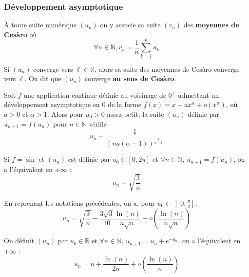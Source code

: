   \subsubsection{Développement asymptotique}


  \begin{definition}
    À toute suite numérique $(u_n)$ on y associe sa suite $(v_n)$ des \textbf{moyennes de Cesàro} où
    \[ \forall n \in \mathbb{N}, v_n = \frac{1}{n} \sum_{k=1}^{n} u_k \]
  \end{definition}

  \begin{theorem}
    Si $(u_n)$ converge vers $\ell \in \mathbb{K}$, alors sa suite des moyennes de Cesàro converge vers $\ell$. On dit que $(u_n)$ converge \textbf{au sens de Cesàro}.
  \end{theorem}


  \begin{proposition}
    Soit $f$ une application continue définie au voisinage de $0^+$ admettant
    un développement asymptotique en $0$ de la forme $f(x) = x - ax^\alpha + o(x^\alpha)$, où $a > 0$ et $\alpha > 1$. Alors pour $u_0 > 0$ assez petit, la suite $(u_n)$ définie par $u_{n+1} = f(u_n)$ pour $n \in \mathbb{N}$ vérifie
    \[ u_n \sim \frac{1}{(na(\alpha-1))^{\frac{1}{\alpha-1}}} \]
  \end{proposition}

  \begin{example}
    Si $f = \sin$ et $(u_n)$ est définie par $u_0 \in [0, 2\pi]$ et $\forall n \in \mathbb{N}, \, u_{n+1} = f(u_n)$, on a l'équivalent en $+\infty$ :
    \[ u_n \sim \sqrt{\frac{3}{n}} \]
  \end{example}


  \begin{proposition}
    En reprenant les notations précédentes, on a, pour $u_0 \in \left] 0, \frac{\pi}{2} \right]$,
    \[ u_n = \sqrt{\frac{3}{n}} - \frac{3 \sqrt{3}}{10} \frac{\ln(n)}{n\sqrt{n}} + o\left( \frac{\ln(n)}{n\sqrt{n}} \right) \]
  \end{proposition}


  \begin{example}
    On définit $(u_n)$ par $u_0 \in \mathbb{R}$ et $\forall n \in \mathbb{N}, \, u_{n+1} = u_n + e^{-u_n}$, on a l'équivalent en $+\infty$ :
    \[ u_n = n + \frac{\ln(n)}{2n} + o\left( \frac{\ln(n)}{n} \right) \]
  \end{example}

